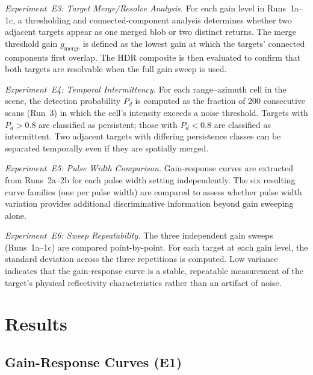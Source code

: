 \documentclass[twocolumn, 10pt]{article}
\begin{document}
\textit{Experiment~E3: Target Merge/Resolve Analysis.} For each gain level in Runs~1a--1c, a thresholding and connected-component analysis determines whether two adjacent targets appear as one merged blob or two distinct returns. The merge threshold gain $g_{\text{merge}}$ is defined as the lowest gain at which the targets' connected components first overlap. The HDR composite is then evaluated to confirm that both targets are resolvable when the full gain sweep is used.

\textit{Experiment~E4: Temporal Intermittency.} For each range--azimuth cell in the scene, the detection probability $P_d$ is computed as the fraction of 200 consecutive scans (Run~3) in which the cell's intensity exceeds a noise threshold. Targets with $P_d > 0.8$ are classified as persistent; those with $P_d < 0.8$ are classified as intermittent. Two adjacent targets with differing persistence classes can be separated temporally even if they are spatially merged.

\textit{Experiment~E5: Pulse Width Comparison.} Gain-response curves are extracted from Runs~2a--2b for each pulse width setting independently. The six resulting curve families (one per pulse width) are compared to assess whether pulse width variation provides additional discriminative information beyond gain sweeping alone.

\textit{Experiment~E6: Sweep Repeatability.} The three independent gain sweeps (Runs~1a--1c) are compared point-by-point. For each target at each gain level, the standard deviation across the three repetitions is computed. Low variance indicates that the gain-response curve is a stable, repeatable measurement of the target's physical reflectivity characteristics rather than an artifact of noise.


\section{Results}


\subsection{Gain-Response Curves (E1)}
\end{document}
